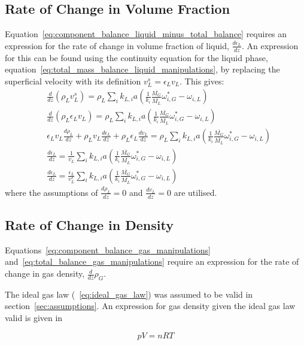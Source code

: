 \documentclass{article}
\begin{document}
\subsection{Rate of Change in Volume Fraction}
Equation~\ref{eq:component_balance_liquid_minus_total_balance} requires an expression for the rate of change in volume fraction of liquid, $\frac{d\epsilon_L}{dz}$. An expression for this can be found using the continuity equation for the liquid phase, equation~\ref{eq:total_mass_balance_liquid_manipulations}, by replacing the superficial velocity with its definition $v_L^s=\epsilon_Lv_L$. This gives:
\begin{equation}
	\begin{split}
	&\frac{d}{dz}\left(\rho_Lv_L^s\right) =\rho_L\sum_ik_{L,i}a(\frac{1}{k_i}\frac{\overline{M_G}}{\overline{M_L}}\omega_{i,G}^*-\omega_{i,L}) \\
	&\frac{d}{dz}\left(\rho_L \epsilon_Lv_L \right) =\rho_L\sum_ik_{L,i}a(\frac{1}{k_i}\frac{\overline{M_G}}{\overline{M_L}}\omega_{i,G}^*-\omega_{i,L}) \\
	& \epsilon_L v_L \frac{d \rho_L}{dz} + \rho_Lv_L \frac{d\epsilon_L}{dz} + \rho_L \epsilon_L \frac{d v_L}{dz} = \rho_L\sum_ik_{L,i}a(\frac{1}{k_i}\frac{\overline{M_G}}{\overline{M_L}}\omega_{i,G}^*-\omega_{i,L}) \\
	&\frac{d \epsilon_L}{dz} = \frac{1}{v_L}\sum_ik_{L,i}a(\frac{1}{k_i}\frac{\overline{M_G}}{\overline{M_L}}\omega_{i,G}^*-\omega_{i,L})\\
	&\frac{d \epsilon_L}{dz} = \frac{\epsilon_L}{v_L^s}\sum_ik_{L,i}a(\frac{1}{k_i}\frac{\overline{M_G}}{\overline{M_L}}\omega_{i,G}^*-\omega_{i,L})
	\end{split}
	\label{eq:change_in_volume_fraction_liquid}
\end{equation}
where the assumptions of $\frac{d \rho_L}{dz}=0$ and $\frac{dv_L}{dz}=0$ are utilised.

\subsection{Rate of Change in Density}
Equations~\ref{eq:component_balance_gas_manipulations} and~\ref{eq:total_balance_gas_manipulations} require an expression for the rate of change in gas density, $\frac{d}{dz}\rho_G$.

The ideal gas law (~\ref{eq:ideal_gas_law}) was assumed to be valid in section~\ref{sec:assumptions}. An expression for gas density given the ideal gas law valid is given in 

\begin{equation}
	pV = nRT
	\label{eq:ideal_gas_law}
\end{equation}
\end{document}
